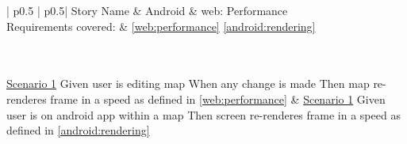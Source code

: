 \begin{longtable}{| p{} | p{}|}
	\hline
	\newline Story Name & \newline Android \& web: Performance\\\hline
	\newline Requirements covered: & \newline \ref{web:performance} \ref{android:rendering}\\\hline
	\\\hline
	\\\hline
	
	\newline\underline{Scenario 1}\newline
	Given user is editing map\newline
	When any change is made\newline 
	Then map re-renderes frame in a speed as defined in \ref{web:performance} \newline
	&
	\newline\underline{Scenario 1}\newline
	Given user is on android app within a map \newline
	Then screen re-renderes frame in a speed as defined in \ref{android:rendering} \newline
	
	\\\hline
\end{longtable}

